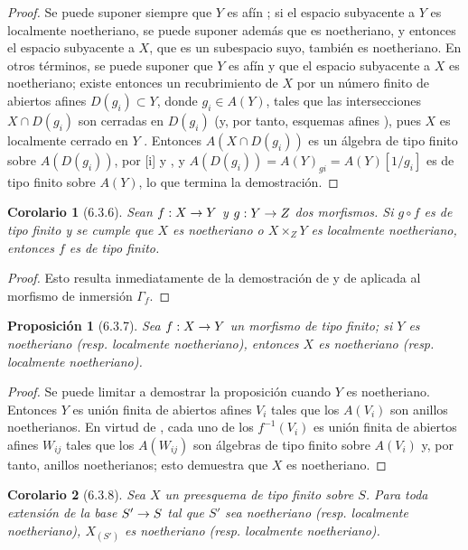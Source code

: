 \documentclass[oneside]{amsart}
\theoremstyle{ega-env-style}
\theoremstyle{ega-thm-env-style}
\newtheorem*{proposition}{Proposición}
\newtheorem*{corollary}{Corolario}
\theoremstyle{ega-defn-env-style}
\renewcommand{\to}{\mathchoice{\longrightarrow}{\rightarrow}{\rightarrow}{\rightarrow}}
\let\EGAOriginalLabel\label
\renewcommand{\label}[1]{\phantomsection\EGAOriginalLabel{#1}}
\begin{document}
\begin{proof}
Se puede suponer siempre que $Y$ es afín ;
si el espacio subyacente a $Y$ es localmente noetheriano, se puede suponer además que es noetheriano, y entonces el espacio subyacente a $X$, que es un subespacio suyo, también es noetheriano.
En otros términos, se puede suponer que $Y$ es afín y que el espacio subyacente a $X$ es noetheriano;
existe entonces un recubrimiento de $X$ por un número finito de abiertos afines $D(g_i)\subset Y$, donde $g_i\in A(Y)$, tales que las intersecciones $X\cap D(g_i)$ son cerradas en $D(g_i)$ (y, por tanto, esquemas afines ), pues $X$ es localmente cerrado en $Y$ .
Entonces $A(X\cap D(g_i))$ es un álgebra de tipo finito sobre $A(D(g_i))$, por [i] y , y $A(D(g_i))=A(Y)_{gi}=A(Y)[1/g_i]$ es de tipo finito sobre $A(Y)$, lo que termina la demostración.
\end{proof}

\begin{corollary}[6.3.6]
\label{I.6.3.6}
Sean $f:X\to Y$ y $g:Y\to Z$ dos morfismos.
Si $g\circ f$ es de tipo finito y se cumple que $X$ es noetheriano o $X\times_Z Y$ es localmente noetheriano, entonces $f$ es de tipo finito.
\end{corollary}

\begin{proof}
Esto resulta inmediatamente de la demostración de  y de  aplicada al morfismo de inmersión $\Gamma_f$.
\end{proof}

\begin{proposition}[6.3.7]
\label{I.6.3.7}
Sea $f:X\to Y$ un morfismo de tipo finito;
si $Y$ es noetheriano \textup{(resp.} localmente noetheriano), entonces $X$ es noetheriano \textup{(resp.} localmente noetheriano).
\end{proposition}

\begin{proof}
Se puede limitar a demostrar la proposición cuando $Y$ es noetheriano.
Entonces $Y$ es unión finita de abiertos afines $V_i$ tales que los $A(V_i)$ son anillos noetherianos.
En virtud de , cada uno de los $f^{-1}(V_i)$ es unión finita de abiertos afines $W_{ij}$ tales que los $A(W_{ij})$ son álgebras de tipo finito sobre $A(V_i)$ y, por tanto, anillos noetherianos;
esto demuestra que $X$ es noetheriano.
\end{proof}

\begin{corollary}[6.3.8]
\label{I.6.3.8}
Sea $X$ un preesquema de tipo finito sobre $S$.
Para toda extensión de la base $S'\to S$ tal que $S'$ sea noetheriano \textup{(resp.} localmente noetheriano), $X_{(S')}$ es noetheriano \textup{(resp.} localmente noetheriano).
\end{corollary}
\end{document}
